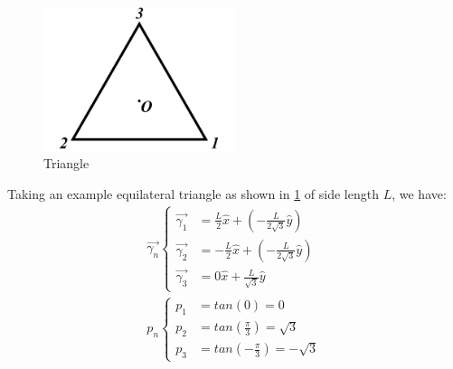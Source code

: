 \begin{figure}[H]
  \centering
  \includegraphics[width=0.5\textwidth]{Triangle.png}
  \caption{Triangle}
  \label{fig:Triangle}
\end{figure}

Taking an example equilateral triangle as shown in \cref{fig:Triangle} of side length $L$, we have:
\begin{align}
  \overrightarrow{\gamma_n} \left\{
  \begin{array}{ll}
    \overrightarrow{\gamma_1} & = \frac{L}{2}\hat{x} + (-\frac{L}{2\sqrt{3}}\hat{y})  \\
    \overrightarrow{\gamma_2} & = -\frac{L}{2}\hat{x} + (-\frac{L}{2\sqrt{3}}\hat{y}) \\
    \overrightarrow{\gamma_3} & = 0\hat{x} + \frac{L}{\sqrt{3}}\hat{y}
  \end{array}
  \right. \\
  p_n \left\{
  \begin{array}{ll}
    p_1 & = tan(0) = 0                      \\
    p_2 & = tan(\frac{\pi}{3}) = \sqrt{3}   \\
    p_3 & = tan(-\frac{\pi}{3}) = -\sqrt{3}
  \end{array}
  \right.
\end{align}

